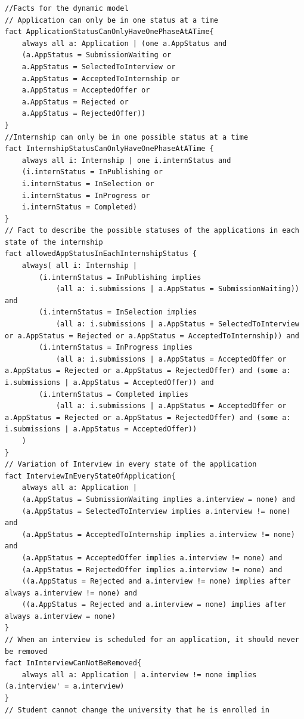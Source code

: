 \begin{lstlisting}
//Facts for the dynamic model
// Application can only be in one status at a time
fact ApplicationStatusCanOnlyHaveOnePhaseAtATime{
    always all a: Application | (one a.AppStatus and
    (a.AppStatus = SubmissionWaiting or 
    a.AppStatus = SelectedToInterview or 
    a.AppStatus = AcceptedToInternship or 
    a.AppStatus = AcceptedOffer or 
    a.AppStatus = Rejected or 
    a.AppStatus = RejectedOffer))
}
//Internship can only be in one possible status at a time
fact InternshipStatusCanOnlyHaveOnePhaseAtATime {
    always all i: Internship | one i.internStatus and 
    (i.internStatus = InPublishing or
    i.internStatus = InSelection or
    i.internStatus = InProgress or
    i.internStatus = Completed)
}
// Fact to describe the possible statuses of the applications in each state of the internship
fact allowedAppStatusInEachInternshipStatus {
    always( all i: Internship | 
        (i.internStatus = InPublishing implies 
            (all a: i.submissions | a.AppStatus = SubmissionWaiting)) and 
        (i.internStatus = InSelection implies 
            (all a: i.submissions | a.AppStatus = SelectedToInterview or a.AppStatus = Rejected or a.AppStatus = AcceptedToInternship)) and
        (i.internStatus = InProgress implies 
            (all a: i.submissions | a.AppStatus = AcceptedOffer or a.AppStatus = Rejected or a.AppStatus = RejectedOffer) and (some a: i.submissions | a.AppStatus = AcceptedOffer)) and 
        (i.internStatus = Completed implies  
            (all a: i.submissions | a.AppStatus = AcceptedOffer or a.AppStatus = Rejected or a.AppStatus = RejectedOffer) and (some a: i.submissions | a.AppStatus = AcceptedOffer))
    )
}
// Variation of Interview in every state of the application
fact InterviewInEveryStateOfApplication{
    always all a: Application | 
    (a.AppStatus = SubmissionWaiting implies a.interview = none) and
    (a.AppStatus = SelectedToInterview implies a.interview != none) and
    (a.AppStatus = AcceptedToInternship implies a.interview != none) and
    (a.AppStatus = AcceptedOffer implies a.interview != none) and
    (a.AppStatus = RejectedOffer implies a.interview != none) and
    ((a.AppStatus = Rejected and a.interview != none) implies after always a.interview != none) and
    ((a.AppStatus = Rejected and a.interview = none) implies after always a.interview = none)
}
// When an interview is scheduled for an application, it should never be removed
fact InInterviewCanNotBeRemoved{
    always all a: Application | a.interview != none implies (a.interview' = a.interview)
}
// Student cannot change the university that he is enrolled in

\end{lstlisting}
